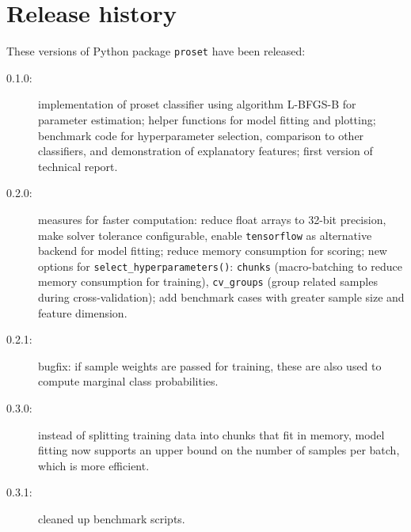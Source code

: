 \section{Release history}
\label{sec_release_history}
%
These versions of Python package \texttt{proset} have been released:
%
\begin{description}
\item[0.1.0:] implementation of proset classifier using algorithm L-BFGS-B \cite{Byrd_95} for parameter estimation;
helper functions for model fitting and plotting;
benchmark code for hyperparameter selection, comparison to other classifiers, and demonstration of explanatory features;
first version of technical report.
%
\item[0.2.0:] measures for faster computation: reduce float arrays to 32-bit precision, make solver tolerance configurable,
enable \texttt{tensorflow} \cite{Abadi_15} as alternative backend for model fitting;
reduce memory consumption for scoring;
new options for \texttt{select\_hyperparameters()}: \texttt{chunks} (macro-batching to reduce memory consumption for training), \texttt{cv\_groups} (group related samples during cross-validation);
add benchmark cases with greater sample size and feature dimension.
%
\item[0.2.1:] bugfix: if sample weights are passed for training, these are also used to compute marginal class probabilities.
%
\item[0.3.0:] instead of splitting training data into chunks that fit in memory, model fitting now supports an upper bound
on the number of samples per batch, which is more efficient.
%
\item[0.3.1:] cleaned up benchmark scripts.
\end{description}
%
\endinput
